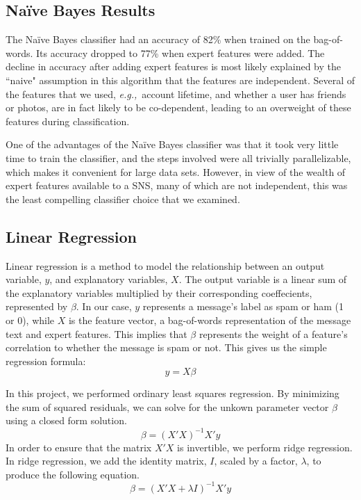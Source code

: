 \documentclass[preprint]{acm_proc_article-sp}
\newcommand{\eg}{{\em e.g.,}~}
\begin{document}
\subsection{Na\"ive Bayes Results}

The Na\"ive Bayes classifier had an accuracy of 82\% when trained on the bag-of-words. Its accuracy dropped 
to 77\% when expert features were added. The decline in accuracy after adding expert features is most likely 
explained by the ``naive" assumption in this algorithm that the features are independent. Several of 
the features that we used, \eg{account lifetime, and whether a user has friends or photos}, are in 
fact likely to be co-dependent, leading to an overweight of these features during classification. 

One of the advantages of the Na\"ive Bayes classifier was that it took very little time to train the classifier, 
and the steps involved were all trivially parallelizable, which makes it convenient for large data sets. 
However, in view of the wealth of expert features available to a SNS, many of which are not independent, this was 
the least compelling classifier choice that we examined.

\subsection{Linear Regression}

Linear regression is a method to model the relationship between an output variable, 
$y$, and explanatory variables, $X$. The output variable is a linear sum of the explanatory 
variables multiplied by their corresponding coeffecients, represented by $\beta$. 
In our case, $y$ represents a message's label as spam or ham (1 or 0), 
while $X$ is the feature vector, a bag-of-words representation of the message text and expert features. 
This implies that $\beta$ represents the weight of a feature's correlation to whether 
the message is spam or not. This gives us the simple regression formula: $$y=X\beta$$

In this project, we performed ordinary least squares regression. By minimizing the sum of squared 
residuals, we can solve for the unkown parameter vector $\beta$ using a closed form solution. 
$$\beta=(X'X)^{-1}X'y$$ In order to ensure that the matrix $X'X$ is invertible, we perform ridge regression. 
In ridge regression, we add the identity matrix, $I$, scaled by a factor, $\lambda$, to 
produce the following equation. $$\beta=(X'X+\lambda I)^{-1}X'y$$
\end{document}
